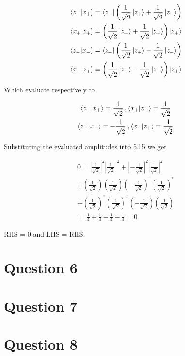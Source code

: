 \documentclass{article}
\begin{document}
    \begin{gather}
        \braket{z_-|x_+} = \bra{z_-}\left( \frac{1}{\sqrt{2}}\ket{z_+} + \frac{1}{\sqrt{2}}\ket{z_-} \right)\\
        \braket{x_+|z_+} = \left( \frac{1}{\sqrt{2}}\ket{z_+} + \frac{1}{\sqrt{2}}\ket{z_-} \right)\ket{z_+}\\
        \braket{z_-|x_-} = \bra{z_-}\left( \frac{1}{\sqrt{2}}\ket{z_+} - \frac{1}{\sqrt{2}}\ket{z_-} \right)\\
        \braket{x_-|z_+} = \left( \frac{1}{\sqrt{2}}\ket{z_+} - \frac{1}{\sqrt{2}}\ket{z_-} \right)\ket{z_+}
    \end{gather}

    Which evaluate respectively to

    \begin{gather}
        \braket{z_-|x_+} = \frac{1}{\sqrt{2}}\:,
        \braket{x_+|z_+} = \frac{1}{\sqrt{2}}\\
        \braket{z_-|x_-} = -\frac{1}{\sqrt{2}}\:,
        \braket{x_-|z_+} = \frac{1}{\sqrt{2}}
    \end{gather}

    Substituting the evaluated amplitudes into 5.15 we get

    \begin{gather}
        0 = |\frac{1}{\sqrt{2}}|^2|\frac{1}{\sqrt{2}}|^2 + |-\frac{1}{\sqrt{2}}|^2|\frac{1}{\sqrt{2}}|^2\\
          + (\frac{1}{\sqrt{2}})(\frac{1}{\sqrt{2}})(-\frac{1}{\sqrt{2}})^*(\frac{1}{\sqrt{2}})^*\\
          + (\frac{1}{\sqrt{2}})^*(\frac{1}{\sqrt{2}})^*(-\frac{1}{\sqrt{2}})(\frac{1}{\sqrt{2}})\\
          = \frac{1}{4} + \frac{1}{4} - \frac{1}{4} - \frac{1}{4} = 0
    \end{gather}

    RHS = 0 and LHS = RHS.

    


\section{Question 6}


\section{Question 7}


\section{Question 8}
\end{document}
